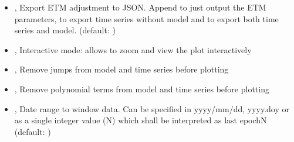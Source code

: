 \documentclass[letterpaper,10pt,english]{sphinxmanual}
\begin{document}
\begin{itemize}
\item {} 
\sphinxAtStartPar
{\hyperref[\detokenize{pgamit.com:PlotETM.py--json}]{}} , {\hyperref[\detokenize{pgamit.com:PlotETM.py---json}]{}}  \sphinxhyphen{} Export ETM adjustment to JSON. Append \sphinxcode{\sphinxupquote{\textquotesingle{}0\textquotesingle{}}} to just output the ETM parameters, \sphinxcode{\sphinxupquote{\textquotesingle{}1\textquotesingle{}}} to export time series without model and \sphinxcode{\sphinxupquote{\textquotesingle{}2\textquotesingle{}}} to export both time series and model. (default: )

\item {} 
\sphinxAtStartPar
{\hyperref[\detokenize{pgamit.com:PlotETM.py--gui}]{}}, {\hyperref[\detokenize{pgamit.com:PlotETM.py---interactive}]{}} \sphinxhyphen{} Interactive mode: allows to zoom and view the plot interactively

\item {} 
\sphinxAtStartPar
{\hyperref[\detokenize{pgamit.com:PlotETM.py--rj}]{}}, {\hyperref[\detokenize{pgamit.com:PlotETM.py---remove_jumps}]{}} \sphinxhyphen{} Remove jumps from model and time series before plotting

\item {} 
\sphinxAtStartPar
{\hyperref[\detokenize{pgamit.com:PlotETM.py--rp}]{}}, {\hyperref[\detokenize{pgamit.com:PlotETM.py---remove_polynomial}]{}} \sphinxhyphen{} Remove polynomial terms from model and time series before plotting

\item {} 
\sphinxAtStartPar
{\hyperref[\detokenize{pgamit.com:PlotETM.py--win}]{}} , {\hyperref[\detokenize{pgamit.com:PlotETM.py---time_window}]{}}  \sphinxhyphen{} Date range to window data. Can be specified in yyyy/mm/dd, yyyy.doy or as a single integer value (N) which shall be interpreted as last epoch\sphinxhyphen{}N (default: )


\end{itemize}
\end{document}
